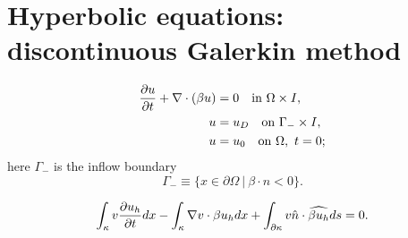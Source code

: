 \chapter{Hyperbolic equations: discontinuous Galerkin method}



\begin{align*}
  \frac{\partial u}{\partial t} + \nabla \cdot (\beta u) &= 0 \quad \text{in } \Omega \times I, \\
  u &= u_D \quad \text{on } \Gamma_- \times I, \\
  u &= u_0 \quad \text{on } \Omega, \ t = 0;
\end{align*}
here $\Gamma_-$ is the inflow boundary
\begin{equation*}
  \Gamma_- \equiv \{ x \in \partial \Omega \ | \ \beta \cdot n < 0 \}.
\end{equation*}

\begin{equation*}
  \int_\kappa v \frac{\partial u_h}{\partial t} dx
  - \int_\kappa \nabla v \cdot \beta u_h dx
  + \int_{\partial \kappa} v \hat n \cdot \widehat{\beta u_h} ds = 0. 
\end{equation*}


